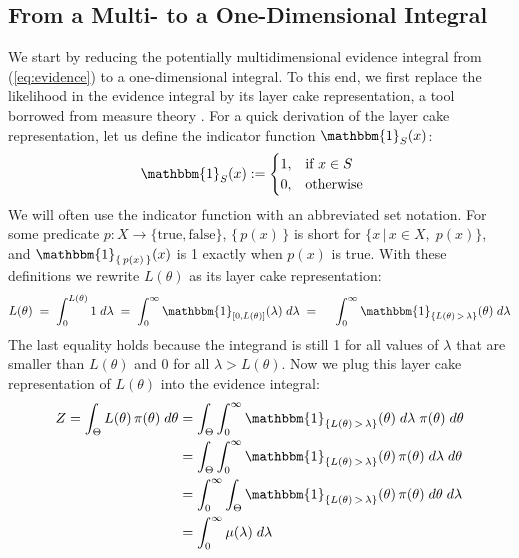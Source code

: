 \documentclass[12pt, a4paper]{report}
\begin{document}
\subsection{From a Multi- to a One-Dimensional Integral}
We start by reducing the potentially multidimensional evidence integral from (\ref{eq:evidence}) to a one-dimensional integral.
To this end, we first replace the likelihood in the evidence integral by its layer cake representation, a tool borrowed from measure theory \cite[26]{liebloss}.
For a quick derivation of the layer cake representation, let us define the indicator function $\mathbbm{1}_S(x)$:
\begin{align*}
    \mathbbm{1}_{S}(x) &:= \begin{cases}
        1, & \textrm{if } x \in S \\
        0, & \textrm{otherwise}
    \end{cases}
\end{align*}
We will often use the indicator function with an abbreviated set notation.
For some predicate $p: X \rightarrow \{\textrm{true}, \textrm{false}\}$, $\{\,p(x)\,\}$ is short for $\{x \,|\, x \in X,\; p(x) \}$, and $\mathbbm{1}_{\{\,p(x)\,\}} (x)$ is 1 exactly when $p(x)$ is true.
With these definitions we rewrite $L(\theta)$ as its layer cake representation:
\begin{align*}
    L(\theta) 
    \; = \; \int_0^{L(\theta)} 1 \; d\lambda
    \; = \; \int_0^{\infty} \mathbbm{1}_{[0,L(\theta)]}(\lambda) \; d\lambda
    \; = \; \quad \int_0^{\infty} \mathbbm{1}_{\{ L(\theta) \, > \, \lambda \}}(\theta) \; d\lambda 
\end{align*}
The last equality holds because the integrand is still 1 for all values of $\lambda$ that are smaller than $L(\theta)$ and 0 for all $\lambda > L(\theta)$.
Now we plug this layer cake representation of $L(\theta)$ into the evidence integral:
\begin{align}
    Z = \int_\Theta L(\theta) \, \pi(\theta) \; d\theta &= \int_{\Theta} \int_0^{\infty} \mathbbm{1}_{\{ L(\theta) \, > \, \lambda \}}(\theta) \; d\lambda \; \pi(\theta) \; d\theta \nonumber\\
    &= \int_\Theta \int_0^{\infty} \mathbbm{1}_{\{ L(\theta) \, > \, \lambda \}}(\theta) \, \pi(\theta) \; d\lambda \; d\theta \nonumber\\
    &= \int_0^{\infty} \int_\Theta \mathbbm{1}_{\{ L(\theta) \, > \, \lambda \}}(\theta) \, \pi(\theta) \; d\theta \; d\lambda \label{eq:tonelli}\\
    &= \int_0^{\infty} \mu(\lambda) \; d\lambda
    \label{eq:integral_2}
\end{align}
\end{document}
